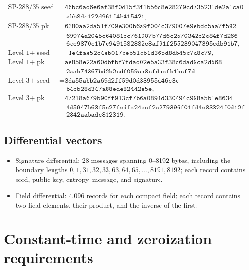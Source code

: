 \documentclass[11pt,a4paper]{article}
\begin{document}
\begin{align*}
\text{SP-288/35 seed} &= \texttt{46bc6ad6e6af38f0d15f3f1b56d8e28279cd735231de2a1ca0}\\
&\quad\texttt{abb8dc122d961f4b415421},\\
\text{SP-288/35 pk} &= \texttt{6380aa2da51f709e300b6a9f004c379007e9ebdc5aa7f592}\\
&\quad\texttt{69974a2045e64081cc761907b77d6c2570342e2e84f7d266}\\
&\quad\texttt{6ce9870c1b7e9491582882e8af91f255239047395cdb91b7},\\
\text{Level 1+ seed} &= \texttt{1e4fae52c4eb017ceb51cb1d365d8db45c7d8c79},\\
\text{Level 1+ pk} &= \texttt{ae858e22a60dbfbf7fdad02e5a33f38d6dad9ca2d568}\\
&\quad\texttt{2aab74367bd2b2cdf059aa8cfdaafb1bcf7d},\\
\text{Level 3+ seed} &= \texttt{3da55abb2a69d2ff59d0d33955d46c3c}\\
&\quad\texttt{b4cb28d347a88ede82442e5e},\\
\text{Level 3+ pk} &= \texttt{47218a679b90ff913cf7b6a0891d330494c998a5b1e8634}\\
&\quad\texttt{4d5947b63f5e27fedfa24ecf2a279396f01fd4e83324f0d12f}\\
&\quad\texttt{2842aabadc812319}.
\end{align*}

\subsection{Differential vectors}

\begin{itemize}
  \item Signature differential: 28 messages spanning 0--8192 bytes,
        including the boundary lengths $0,1,31,32,33,63,64,65,\ldots,
        8191,8192$; each record contains seed, public key, entropy, message,
        and signature.
  \item Field differential: 4,096 records for each compact field; each record
        contains two field elements, their product, and the inverse of the
        first.
\end{itemize}

\section{Constant-time and zeroization requirements}
\end{document}
